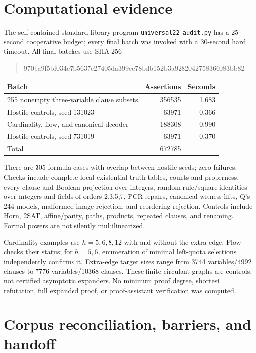 \documentclass[11pt]{article}
\begin{document}
\section{Computational evidence}
The self-contained standard-library program \texttt{universal22\_audit.py} has a 25-second cooperative budget; every final batch was invoked with a 30-second hard timeout. All final batches use SHA-256
\begin{quote}\small\ttfamily
970ba9f5bf034e7b5637e27405da399ee78bdb152b3a9282042758366083bb82
\end{quote}
\begin{center}\begin{tabular}{lrr}\toprule
Batch & Assertions & Seconds\\\midrule
255 nonempty three-variable clause subsets &356535&1.683\\
Hostile controls, seed 131023&63971&0.366\\
Cardinality, flow, and canonical decoder&188308&0.990\\
Hostile controls, seed 731019&63971&0.370\\\midrule
Total&672785&\\\bottomrule
\end{tabular}\end{center}
There are 305 formula cases with overlap between hostile seeds; zero failures. Checks include complete local existential truth tables, counts and properness, every clause and Boolean projection over integers, random rule/square identities over integers and fields of orders 2,3,5,7, PCR repairs, canonical witness lifts, Q's 244 models, malformed-image rejection, and reordering rejection. Controls include Horn, 2SAT, affine/parity, paths, products, repeated clauses, and renaming. Formal powers are not silently multilinearized.

Cardinality examples use $h=5,6,8,12$ with and without the extra edge. Flow checks their status; for $h=5,6$, enumeration of minimal left-quota selections independently confirms it. Extra-edge target sizes range from 3744 variables/4992 clauses to 7776 variables/10368 clauses. These finite circulant graphs are controls, not certified asymptotic expanders. No minimum proof degree, shortest refutation, full expanded proof, or proof-assistant verification was computed.

\section{Corpus reconciliation, barriers, and handoff}
\end{document}
